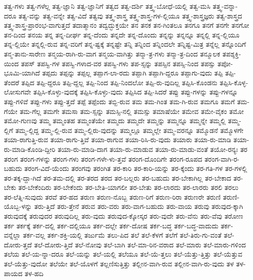 {ತತ್ವ-ಗಳು
ತತ್ವ-ಗಳೆಲ್ಲ
ತತ್ವ-ಜ್ಞಾನಿ
ತತ್ವ-ಜ್ಞಾನಿಗೆ
ತತ್ವದ
ತತ್ವ-ದರ್ಶಿ
ತತ್ತ್ವ-ಬೋಧೆ-ಯಲ್ಲಿ
ತತ್ವ-ಮಸಿ
ತತ್ತ್ವ-ವನ್ನಾ-ದರೂ
ತತ್ವ-ವನ್ನು
ತತ್ವ-ವನ್ನೇ
ತತ್ವ-ವಿದೆ
ತತ್ವವು
ತತ್ತ್ವ-ಶಾಸ್ತ್ರ
ತತ್ತ್ವ-ಶಾಸ್ತ್ರ-ಗಳ-ಲ್ಲಿಯೂ
ತತ್ತ್ವ-ಶಾಸ್ತ್ರಜ್ಞರು
ತತ್ವ-ಶಾಸ್ತ್ರದ
ತತ್ತ್ವ-ಶಾಸ್ತ್ರ-ಪ್ರಾರಂಭ-ವಾಗುತ್ತದೆ
ತದಾತ್ಮಾನಂ
ತದ್ವದ್ಭುಕ್ತಯೇ
ತನ
ತನಕ
ತನ-ಗಿಂತಲೂ
ತನಗೂ
ತನಗೆ
ತನಗೇ
ತನಗೋ
ತನ-ದಿಂದ
ತನಯ
ತನ್ನ
ತನ್ನ-ದೀರ್ಘ
ತನ್ನ-ದೆಂದು
ತನ್ನದೇ
ತನ್ನ-ದೊಂದು
ತನ್ನನ್ನು
ತನ್ನನ್ನೂ
ತನ್ನಲ್ಲಿ
ತನ್ನ-ಲ್ಲಿಯೂ
ತನ್ನ-ಲ್ಲಿಯೇ
ತನ್ನಲ್ಲಿ-ರುವ
ತನ್ನ-ವರಿಗೆ
ತನ್ನ-ಷ್ಟಕ್ಕೆ
ತನ್ನಷ್ಟೇ
ತನ್ನಿ
ತನ್ನಿಂದ
ತನ್ನಿಂದಲೇ
ತನ್ನಿಷ್ಟ-ಮಿತ್ರ
ತನ್ನೆಲ್ಲ
ತನ್ನೊಂದಿಗೆ
ತನ್ಮ-ತಾನು-ಸಾರೇಣ
ತನ್ಮಯ-ರಾಗಿ-ರು-ವಾಗ
ತನ್ಮಯ-ವಾಗಿತ್ತು
ತನ್ಮಾ-ತ್ರ-ಗಳು
ತನ್ಮಾ-ತ್ರ-ದಿಂದ
ತನ್ಮೂಲಕ
ತಪಶ್ಶಕ್ತಿ-ಯಿಂದ
ತಪಸ್
ತಪಸ್ವಿ-ಗಳ
ತಪಸ್ವಿ-ಗಳಾದ-ವರ
ತಪಸ್ವಿ-ಗಳು
ತಪ-ಸ್ಸನ್ನು
ತಪಸ್ಸಿನ
ತಪಸ್ಸಿ-ನಿಂದ
ತಪಸ್ಸು
ತಪೋ-ಭೂಮಿ-ಯಾಗಿದೆ
ತಪ್ಪದು
ತಪ್ಪನ್ನು
ತಪ್ಪಲ್ಲ
ತಪ್ಪಾಗ-ಲಾ-ರದು
ತಪ್ಪಾಗಿ
ತಪ್ಪಾಗಿ-ದ್ದರೂ
ತಪ್ಪಾಗು-ವುದು
ತಪ್ಪಿ
ತಪ್ಪಿ-ತೆಂದರೆ
ತಪ್ಪಿದ
ತಪ್ಪಿ-ದ್ದರೂ
ತಪ್ಪಿ-ದ್ದಲ್ಲ
ತಪ್ಪಿ-ನಿಂದ
ತಪ್ಪಿ-ನಿಂದಲೋ
ತಪ್ಪಿ-ರು-ವುದಿಲ್ಲ
ತಪ್ಪಿಸಿ-ಕೊಂಡನು
ತಪ್ಪಿಸಿ-ಕೊಳ್ಳ-ಲೋಸುಗವೇ
ತಪ್ಪಿಸಿ-ಕೊಳ್ಳು-ವುದಕ್ಕೆ
ತಪ್ಪಿಸಿ-ಕೊಳ್ಳು-ವುದು
ತಪ್ಪಿಸಿದ
ತಪ್ಪಿ-ಸಿದರೆ
ತಪ್ಪು
ತಪ್ಪು-ಗಳನ್ನು
ತಪ್ಪು-ಗಳನ್ನೂ
ತಪ್ಪು-ಗಳಿವೆ
ತಪ್ಪು-ಗಳು
ತಪ್ಪು-ತ್ತದೆ
ತಪ್ಪೆ
ತಪ್ಪೆಂದು
ತಬ್ಬಿ-ರುವ
ತಮ
ತಮ-ಗಿಂತ
ತಮ-ಗಿ-ರುವ
ತಮಗೂ
ತಮಗೆ
ತಮ-ಗೆಯೇ
ತಮ-ಗೆಲ್ಲ
ತಮಗೇ
ತಮಸಾ
ತಮ-ಸ್ಸನ್ನು
ತಮಸ್ಸಿ-ನಲ್ಲಿ
ತಮಸ್ಸು
ತಮಾಷೆಯೇ
ತಮೇವ
ತಮೇ-ವೈಕಂ
ತಮೋ
ತಮೋ-ಗುಣವು
ತಮ್ಮ
ತಮ್ಮಂತಹ
ತಮ್ಮಂತೆಯೇ
ತಮ್ಮದು
ತಮ್ಮದೇ
ತಮ್ಮನ್ನು
ತಮ್ಮನ್ನೂ
ತಮ್ಮನ್ನೇ
ತಮ್ಮಲ್ಲಿ
ತಮ್ಮ-ಲ್ಲಿಗೆ
ತಮ್ಮ-ಲ್ಲಿದ್ದ
ತಮ್ಮ-ಲ್ಲಿ-ರುವ
ತಮ್ಮ-ಲ್ಲಿರು-ವುದನ್ನು
ತಮ್ಮಲ್ಲೂ
ತಮ್ಮಲ್ಲೇ
ತಮ್ಮ-ವರನ್ನೂ
ತಮ್ಮೊಡನೆ
ತಮ್ಮೊಳಗೇ
ತಯಾ-ರಾಗುತ್ತಿ-ರುವ
ತಯಾ-ರಾಗು-ತ್ತಿವೆ
ತಯಾ-ರಾಗುವ
ತಯಾ-ರಿಸಿ-ರು-ವುದು
ತಯಾರು
ತಯಾ-ರು-ಮಾಡಿ
ತಯಾ-ರು-ಮಾಡಿ-ಕೊಂಡಿ-ದ್ದೀರಿ
ತಯಾ-ರು-ಮಾಡಿ-ದಾಗ
ತಯಾ-ರು-ಮಾಡುವ
ತಯಾ-ರು-ಮಾಡು-ವಂತೆ
ತಯೋ-ರನ್ಯಃ
ತರ
ತರಂಗ
ತರಂಗ-ಗಳನ್ನು
ತರಂಗ-ಗಳು
ತರಂಗ-ಗಳೇ-ಳು-ತ್ತವೆ
ತರಂಗ-ದೊಂದಿಗೇ
ತರಂಗ-ರೂಪದ
ತರಂಗ-ವಾಗಿ-ರ-ಬಹುದು
ತರಂಗ-ವಿದೆ-ಯೆಂದು
ತರಂಗವು
ತರಂಗಿತ
ತರ-ಕಾರಿ
ತರ-ಕಾರಿ-ಯನ್ನು
ತರ-ಕ್ಕೆಂದು
ತರ-ಗತಿ-ಗಳ
ತರ-ಗಳಲ್ಲಿ
ತರ-ತಕ್ಕ-ದ್ದಾ-ಗಿದೆ
ತರ-ತಮ-ದಲ್ಲಿ
ತರ-ತರದ
ತರದ
ತರ-ಬಲ್ಲರು
ತರ-ಬಹುದು
ತರ-ಬೇಕಾಗಿಲ್ಲ
ತರ-ಬೇಕಾದ
ತರ-ಬೇಕು
ತರ-ಬೇಕೆಂದಿರು
ತರ-ಬೇಕೆಂದು
ತರ-ಬೇತಿ-ಯಾಗಲೀ
ತರ-ಬೇತು
ತರ-ಲಾರದು
ತರ-ಲಾರರು
ತರಲಿ
ತರಲು
ತರ-ಲೆತ್ನಿ-ಸುವುದು
ತರವೆ
ತರ-ಹದ
ತರುಣ
ತರುಣ-ನೊಬ್ಬ
ತರುಣ-ರಿಗೆ
ತರುಣ-ರಿರಾ
ತರುಣರೇ
ತರುಣಿ
ತರುಣಿ-ಯೊಬ್ಬ-ಳನ್ನು
ತರು-ತ್ತಿದೆ
ತರು-ತ್ತೇನೆ
ತರುವ
ತರು-ವರು
ತರು-ವಾಗ-ಬಹುದು
ತರು-ವಾಯ
ತರುವು
ತರುವುದ-ಕ್ಕಾಗಿ
ತರುವುದಕ್ಕೆ
ತರುವುದರ
ತರುವುದಿಲ್ಲ
ತರು-ವುದು
ತರುವುದ-ಕ್ಕೋಸ್ಕರ
ತರು-ವುದೇ
ತರು-ವೆನು
ತರು-ವೆವು
ತರೋಣ
ತರ್ಕ
ತರ್ಕಕ್ಕೆ
ತರ್ಕ-ದಲ್ಲಿ
ತರ್ಕ-ದಲ್ಲಿಯೂ
ತರ್ಕ-ದಲ್ಲೇ
ತರ್ಕ-ದೋಷ
ತರ್ಕ-ಬದ್ಧ
ತರ್ಕ-ಬದ್ಧ-ವಾದುದು
ತರ್ಕ-ವನ್ನೆಲ್ಲಾ
ತರ್ಕ-ವಲ್ಲ
ತರ್ಕ-ಶಕ್ತಿ-ಯಲ್ಲಿ
ತರ್ಜುಮೆ
ತಲು-ಪಿದ
ತಲೆ
ತಲೆ-ಕೆಳಗೆ
ತಲೆಗೆ
ತಲೆ-ತಿರು-ಗು-ವಂತೆ
ತಲೆ-ದೋರು-ತ್ತದೆ
ತಲೆ-ದೋರು-ತ್ತಿದೆ
ತಲೆ-ನೋವು
ತಲೆ-ಬಾಗಿ
ತಲೆ-ಮಾ-ರಿನ-ವರಾದ
ತಲೆ-ಮಾರು
ತಲೆ-ಮಾರು-ಗಳಿಂದ
ತಲೆಯ
ತಲೆ-ಯ-ನ್ನಾ-ದರೂ
ತಲೆ-ಯನ್ನು
ತಲೆ-ಯಲ್ಲಿ
ತಲೆಯೂ
ತಲೆ-ಯೆ-ತ್ತಲು
ತಲೆ-ಯೆತ್ತು-ತ್ತಿತ್ತು
ತಲೆ-ಯೆತ್ತುವ
ತಲೆ-ಯೆತ್ತು-ವುದೋ
ತಲೆಯೇ
ತಲೆ-ಯೊಳಗೆ
ತಲ್ಲಣಿಸುತ್ತಿತ್ತು
ತಲ್ಲೀನ-ವಾಗಿ-ರುವ
ತಲ್ಲೀನ-ವಾಗಿ-ರು-ವುದು
ತಳ
ತಳ-ಪಾಯದ
ತಳ-ಹದಿ
}
